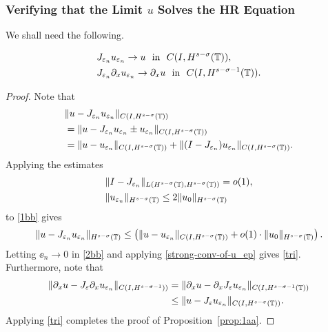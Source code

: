 \subsubsection{Verifying that the Limit $u$ Solves the HR Equation} 
We shall need the following. 
\begin{proposition}
\label{prop:1aa}
\begin{align}
    \label{tri}
& J_{\varepsilon_n} u_{\varepsilon_n} \to  u \ \ \text{in} \ \
C(I, H^{s-\sigma}(\mathbb{T})),
\\
\label{0dd}
& J_{\varepsilon_n} \partial_x u_{\varepsilon_n} \to  \partial_x u \ \
\text{in} \ \ C(I, H^{s-\sigma-1}(\mathbb{T})).
\end{align}
\end{proposition}
\begin{proof} Note that
\begin{equation}
\begin{split}
& \| u -  J_{\varepsilon_n} u_{\varepsilon_n}
\|_{C(I, H^{s-\sigma}(\mathbb{T}))}
\\
&= \| u -  J_{\varepsilon_n} u_{\varepsilon_n} \pm 
u_{\varepsilon_n} \|_{C(I, H^{s-\sigma}(\mathbb{T}))}
\\
& = \| u -  u_{\varepsilon_n}
\|_{C(I,H^{s-\sigma}(\mathbb{T}))} + \| (I - J_{\varepsilon_n})
u_{\varepsilon_n} \|_{C(I, H^{s-\sigma}(\mathbb{T}))}.
\label{1bb}
\end{split}
\end{equation}
Applying the estimates
\begin{equation*}
\begin{split}
& \|I-J_{\varepsilon_n} \|_{L(H^{s-\sigma}(\mathbb{T}), H^{s -
\sigma}(\mathbb{T}))} = o(1),
\\
& \|u_{\varepsilon_n}\|_{H^{s-\sigma}(\mathbb{T})} \le 2
\|u_0\|_{H^{s-\sigma}(\mathbb{T})}
\end{split}
\end{equation*}
to \eqref{1bb} gives
\begin{equation}
\label{2bb}
\begin{split}
\| u -  J_{\varepsilon_n} u_{\varepsilon_n}\|_{H^{s-\sigma}(\mathbb{T})}
\le \left( \| u -  u_{\varepsilon_n}
\|_{C(I, H^{s-\sigma}(\mathbb{T}))} + o(1) \cdot \|u_0
\|_{H^{s-\sigma}(\mathbb{T})} \right).
\end{split}
\end{equation}
Letting $\ee_n \to 0$ in \eqref{2bb} and applying
\eqref{strong-conv-of-u_ep} gives \eqref{tri}. Furthermore, note that
%
%
\begin{equation*}
\begin{split}
\|\partial_x u - J_\varepsilon \partial_x u_{\varepsilon_n} \|_{C(I,
H^{s-\sigma-1}))}  
& = \|\partial_x u - \partial_x J_\varepsilon u_{\varepsilon_n} \|_{C(I,
H^{s-\sigma-1}(\mathbb{T}))} 
\\
& \le \|u - J_\varepsilon u_{\varepsilon_n} \|_{C(I,
H^{s-\sigma}(\mathbb{T}))}.
\end{split}
\end{equation*}
Applying \eqref{tri} completes the proof of Proposition~\ref{prop:1aa}. 
\end{proof}
